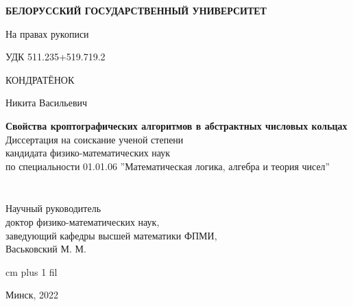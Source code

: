 \thispagestyle{empty}
\normalsize
\begin{center}
{\fontsize{16}{16}\selectfont \textbf{БЕЛОРУССКИЙ ГОСУДАРСТВЕННЫЙ УНИВЕРСИТЕТ}}
\end{center}
\vspace{4ex}
\normalsize

\noindent На правах рукописи\par
\noindent УДК 511.235+519.719.2 

\normalsize
\begin{center}
\vspace{6ex}
{\fontsize{16}{16}\selectfont КОНДРАТЁНОК}

{\fontsize{16}{16}\selectfont Никита Васильевич}
\end{center}
\vspace{0ex}
\begin{center}
\large
\textbf{Свойства кроптографических алгоритмов в абстрактных числовых кольцах}\\
\vspace{4ex}
{\fontsize{15}{15}\selectfont Диссертация на соискание ученой степени}\\
{\fontsize{15}{15}\selectfont кандидата физико-математических наук}\\
\vspace{2ex}
{\fontsize{15}{15}\selectfont по специальности 01.01.06 ''Математическая логика, алгебра и теория чисел''}
\vspace{2ex}
\end{center}


\normalsize
\vspace{3ex}
\begin{minipage}{0.4\textwidth}
  \begin{flushleft}
$\,$\\
$\,$\\
$\,$\\
$\,$\\
\end{flushleft}
\end{minipage}
$\quad$
\begin{minipage}{0.6\textwidth}
  \begin{flushleft}
Научный руководитель\\
доктор физико-математических наук,\\
заведующий кафедры высшей математики ФПМИ,\\
Васьковский М. М.\\
  \end{flushleft}
\end{minipage}


 cm plus 1 fil
\begin{center}
Минск, 2022
\end{center}
\eject
